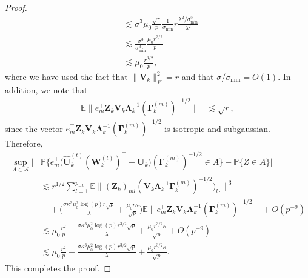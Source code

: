 \documentclass[10pt]{article}
\newcommand{\0}{{\mathbf{0}}}
\newcommand{\1}{{\mathbf{1}}}
\newcommand{\E}{{\mathbf{E}}}
\newcommand{\U}{{\mathbf{U}}}
\renewcommand{\t}{^{\top}}
\newcommand{\uhat}{\mathbf{\hat{U}}}
\newcommand{\p}{\mathbb{P}}
\newcommand{\inv}{^{-1}}
\renewcommand{\E}{\mathbb{E}}
\renewcommand{\hat}{\widehat}
\renewcommand{\hat}{\widehat}
\begin{document}
\begin{proof}
\begin{align*}
    &\lesssim \sigma^3 \mu_0 \frac{\sqrt{r}}{p} \frac{1}{\sigma_{\min}} r \frac{\lambda^2/\sigma_{\min}^2}{\lambda^2} \\
    &\lesssim \frac{\sigma^3}{\sigma_{\min}^3} \frac{\mu_0 r^{3/2}}{p} \\
    &\lesssim \mu_0 \frac{r^{3/2}}{p},
\end{align*}
where we have used the fact that $\|\mathbf{V}_k\|^2_F = r$ and that $\sigma/\sigma_{\min} = O(1)$.  In addition, we note that
\begin{align*}
    \E \| e_m\t \mathbf{Z}_k \mathbf{V}_k \mathbf{\Lambda}_k\inv (\mathbf{\Gamma}^{(m)}_k)^{-1/2} \| &\lesssim \sqrt{r},
\end{align*}
since the vector $e_m\t\mathbf{Z}_k\mathbf{V}_k \mathbf{\Lambda}_k\inv (\mathbf{\Gamma}^{(m)}_k)^{-1/2} $ is isotropic and subgaussian.  Therefore,
\begin{align*}
     \sup_{A \in \mathcal{A}} | &\p\bigg\{ e_m\t \bigg( \uhat_k^{(t)} (\mathbf{W}_k^{(t)})\t - \U_k \bigg) (\mathbf{\Gamma}^{(m)}_k)^{-1/2} \in A \bigg\} - \p \{ Z \in A \} | \\
    &\lesssim r^{1/2} \sum_{l=1}^{p_{-k}} \E \| (\mathbf{Z}_k)_{ml} (\mathbf{V}_k \mathbf{\Lambda}_k\inv \mathbf{\Gamma}^{(m)}_k)^{-1/2}  )_{l\cdot}\|^3 \\
    &\quad + \bigg( \frac{\sigma\kappa^3 \mu_0^2 \log(p) r \sqrt{p}}{\lambda} + \frac{\mu_0 r \kappa }{ \sqrt{p}}\bigg)\E \| e_m\t \mathbf{Z}_k \mathbf{V}_k \mathbf{\Lambda}_k\inv(\mathbf{\Gamma}^{(m)}_k)^{-1/2} \| + O(p^{-9}) \\
    &\lesssim \mu_0 \frac{r^2}{p} + \frac{\sigma\kappa^3 \mu_0^2 \log(p) r^{3/2} \sqrt{p}}{\lambda}  + \frac{\mu_0 r^{3/2} \kappa }{ \sqrt{p}} + O(p^{-9}) \\
    &\lesssim \mu_0 \frac{r^2}{p} + \frac{\sigma\kappa^3 \mu_0^2 \log(p) r^{3/2} \sqrt{p}}{\lambda}  + \frac{\mu_0 r^{3/2} \kappa }{ \sqrt{p}}.
\end{align*}
This completes the proof.
%
%
%
\end{proof}
\end{document}
